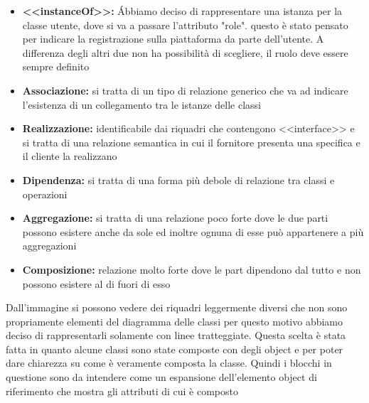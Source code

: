 \documentclass[a4paper, 11pt,oneside]{book}
\newcommand{\spacing}{\par\bigskip\noindent}
\begin{document}
    \begin{itemize}
        \item \textbf{<<instanceOf>>:} \'Abbiamo deciso di rappresentare una istanza per la classe utente, dove si va a passare l'attributo "role". questo
              è stato pensato per indicare la registrazione sulla piattaforma da parte dell'utente. A differenza degli altri due non ha possibilità di scegliere, il ruolo deve essere sempre definito
        \item \textbf{Associazione:} si tratta di un tipo di relazione generico che va ad indicare l'esistenza di un collegamento tra le istanze delle classi
        \item \textbf{Realizzazione:} identificabile dai riquadri che contengono <<interface>> e si tratta di una relazione semantica in cui il fornitore presenta una specifica e il cliente la realizzano
        \item \textbf{Dipendenza:} si tratta di una forma più debole di relazione tra classi e operazioni
        \item \textbf{Aggregazione:} si tratta di una relazione poco forte dove le due parti possono esistere anche da sole ed inoltre ognuna di esse può appartenere a più aggregazioni
        \item \textbf{Composizione:} relazione molto forte dove le part dipendono dal tutto e non possono esistere al di fuori di esso 
    \end{itemize}
    \spacing
    Dall'immagine si possono vedere dei riquadri leggermente diversi che non sono propriamente elementi del diagramma delle classi per questo motivo abbiamo deciso di rappresentarli solamente con linee tratteggiate.
    Questa scelta è stata fatta in quanto alcune classi sono state composte con degli object e per poter dare chiarezza su come è veramente composta la classe. Quindi i blocchi in questione sono da intendere come un espansione
    dell'elemento object di riferimento che mostra gli attributi di cui è composto


\end{document}
